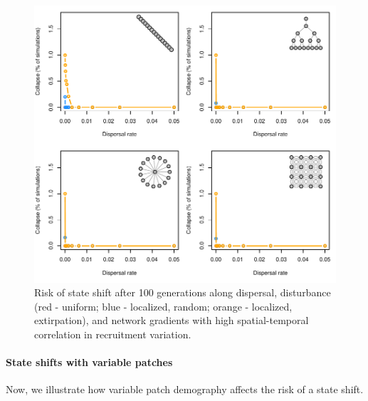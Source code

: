 \documentclass[]{article}
\let\oldparagraph\paragraph
\renewcommand{\paragraph}[1]{\oldparagraph{#1}\mbox{}}
\begin{document}
\begin{figure}[H]

{\centering \includegraphics{Managing_for_ecological_surprises_in_metapopulations_files/figure-latex/collapsed-1} 

}

\caption{Risk of state shift after 100 generations along dispersal, disturbance (red - uniform; blue - localized, random; orange - localized, extirpation), and network gradients with high spatial-temporal correlation in recruitment variation.}\label{fig:collapsed}
\end{figure}
\newpage

\hypertarget{state-shifts-with-variable-patches}{%
\paragraph{State shifts with variable
patches}\label{state-shifts-with-variable-patches}}

Now, we illustrate how variable patch demography affects the risk of a
state shift.
\end{document}
